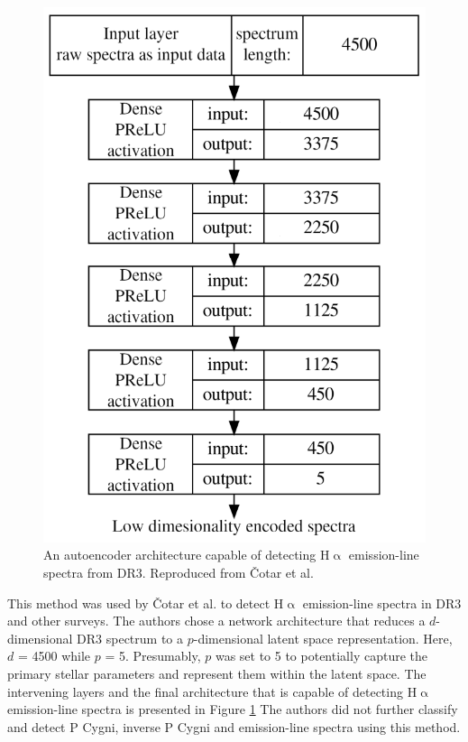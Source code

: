 \begin{figure}[!htb]
\centering
\includegraphics[scale=0.45]{figures/autoencoder.png}
\caption{An autoencoder architecture capable of detecting H$\upalpha$ emission-line spectra from DR3. Reproduced from Čotar et al.\cite{vcotar2021galah}}
\label{fig2.7}
\end{figure}

This method was used by Čotar et al. to detect H$\upalpha$ emission-line spectra in DR3 and other surveys\cite{vcotar2021galah}. The authors chose a network architecture that reduces a $d$-dimensional DR3 spectrum to a $p$-dimensional latent space representation. Here, $d$ = 4500 while $p$ = 5. Presumably, $p$ was set to 5 to potentially capture the primary stellar parameters and represent them within the latent space. The intervening layers and the final architecture that is capable of detecting H$\upalpha$ emission-line spectra is presented in Figure \ref{fig2.7} The authors did not further classify and detect P Cygni, inverse P Cygni and emission-line spectra using this method. 

